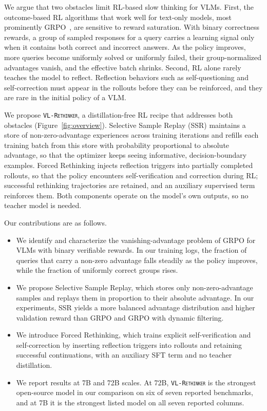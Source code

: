 \documentclass{article}
\newcommand{\model}{\texttt{\textsc{VL-Rethinker}}\xspace}
\begin{document}
We argue that two obstacles limit RL-based slow thinking for VLMs. First, the outcome-based RL algorithms that work well for text-only models, most prominently GRPO~\cite{deepseek-r1}, are sensitive to reward saturation. With binary correctness rewards, a group of sampled responses for a query carries a learning signal only when it contains both correct and incorrect answers. As the policy improves, more queries become uniformly solved or uniformly failed, their group-normalized advantages vanish, and the effective batch shrinks. Second, RL alone rarely teaches the model to reflect. Reflection behaviors such as self-questioning and self-correction must appear in the rollouts before they can be reinforced, and they are rare in the initial policy of a VLM.

We propose \model, a distillation-free RL recipe that addresses both obstacles (Figure~\ref{fig:overview}). Selective Sample Replay (SSR) maintains a store of non-zero-advantage experiences across training iterations and refills each training batch from this store with probability proportional to absolute advantage, so that the optimizer keeps seeing informative, decision-boundary examples. Forced Rethinking injects reflection triggers into partially completed rollouts, so that the policy encounters self-verification and correction during RL; successful rethinking trajectories are retained, and an auxiliary supervised term reinforces them. Both components operate on the model's own outputs, so no teacher model is needed.

Our contributions are as follows.
\begin{itemize}[leftmargin=*]
    \item We identify and characterize the vanishing-advantage problem of GRPO for VLMs with binary verifiable rewards. In our training logs, the fraction of queries that carry a non-zero advantage falls steadily as the policy improves, while the fraction of uniformly correct groups rises.
    \item We propose Selective Sample Replay, which stores only non-zero-advantage samples and replays them in proportion to their absolute advantage. In our experiments, SSR yields a more balanced advantage distribution and higher validation reward than GRPO and GRPO with dynamic filtering.
    \item We introduce Forced Rethinking, which trains explicit self-verification and self-correction by inserting reflection triggers into rollouts and retaining successful continuations, with an auxiliary SFT term and no teacher distillation.
    \item We report results at 7B and 72B scales. At 72B, \model is the strongest open-source model in our comparison on six of seven reported benchmarks, and at 7B it is the strongest listed model on all seven reported columns.
\end{itemize}
\end{document}
